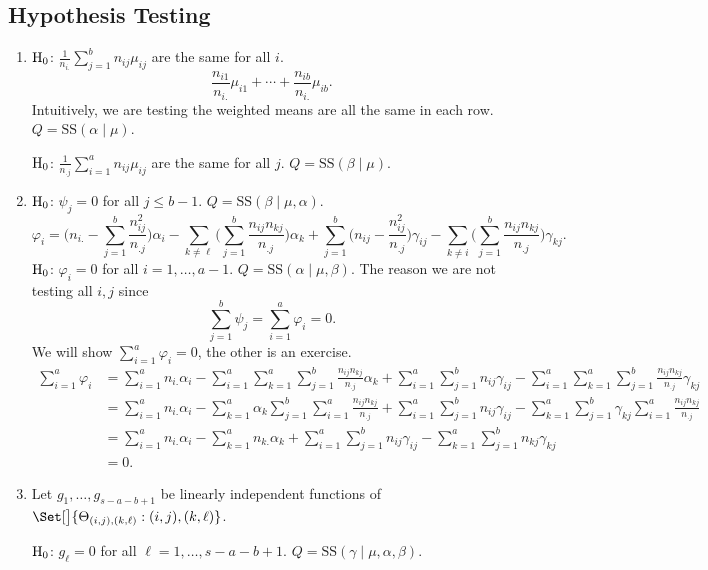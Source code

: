 \subsection*{Hypothesis Testing}
\begin{enumerate}[(1)]
    \item $ \text{H}_0 $: $ \frac{1}{n_{i.}}\sum_{j=1}^{b}n_{ij}\mu_{ij} $ are the same for all $ i $.
          \[ \frac{n_{i1}}{n_{i.}}\mu_{i1}+\cdots+\frac{n_{ib}}{n_{i.}}\mu_{ib}. \]
          Intuitively, we are testing the weighted means are all the same in each row.
          $ Q=\text{SS}(\alpha\mid \mu) $.

          $ \text{H}_0 $: $ \frac{1}{n_{.j}}\sum_{i=1}^{a}n_{ij}\mu_{ij} $ are the same for all $ j $.
          $ Q=\text{SS}(\beta\mid \mu) $.
    \item $ \text{H}_0 $: $ \psi_j=0 $ for all $ j\le b-1 $. $ Q=\text{SS}(\beta\mid \mu,\alpha) $.
          \[ \varphi_i=\biggl(n_{i.}-\sum_{j=1}^{b}\frac{n_{ij}^2}{n_{.j}}\biggr)\alpha_i
              -\sum_{k\ne \ell}\biggl(\sum_{j=1}^{b}\frac{n_{ij}n_{kj}}{n_{.j}}\biggr)\alpha_k
              +\sum_{j=1}^{b}\biggl(n_{ij}-\frac{n_{ij}^2}{n_{.j}}\biggr)\gamma_{ij}-\sum_{k\ne i}
              \biggl(\sum_{j=1}^{b}\frac{n_{ij}n_{kj}}{n_{.j}}\biggr)\gamma_{kj}. \]
          $ \text{H}_0 $: $ \varphi_i=0 $ for all $ i=1,\ldots,a-1 $. $ Q=\text{SS}(\alpha\mid \mu,\beta) $.
          The reason we are not testing all $ i,j $ since
          \[ \sum_{j=1}^{b}\psi_j=\sum_{i=1}^{a}\varphi_i=0. \]
          We will show $ \sum_{i=1}^{a}\varphi_i=0 $, the other is an exercise.
          \begin{align*}
              \sum_{i=1}^{a}\varphi_i
               & =\sum_{i=1}^{a}n_{i.}\alpha_i-\sum_{i=1}^{a}\sum_{k=1}^{a}\sum_{j=1}^{b}\frac{n_{ij}n_{kj}}{n_{.j}}\alpha_k
              +\sum_{i=1}^{a}\sum_{j=1}^{b}n_{ij}\gamma_{ij}-\sum_{i=1}^{a}\sum_{k=1}^{a}\sum_{j=1}^{b}\frac{n_{ij}n_{kj}}{n_{.j}}\gamma_{kj} \\
               & =\sum_{i=1}^{a}n_{i.}\alpha_i
              -\sum_{k=1}^{a}\alpha_k\sum_{j=1}^{b}\sum_{i=1}^{a}\frac{n_{ij}n_{kj}}{n_{.j}}
              +\sum_{i=1}^{a}\sum_{j=1}^{b}n_{ij}\gamma_{ij}
              -\sum_{k=1}^{a}\sum_{j=1}^{b}\gamma_{kj}\sum_{i=1}^{a}\frac{n_{ij}n_{kj}}{n_{.j}}                                               \\
               & =\sum_{i=1}^{a}n_{i.}\alpha_i-\sum_{k=1}^{a}n_{k.}\alpha_k
              +\sum_{i=1}^{a}\sum_{j=1}^{b}n_{ij}\gamma_{ij}-\sum_{k=1}^{a}\sum_{j=1}^{b}n_{kj}\gamma_{kj}                                    \\
               & =0.
          \end{align*}
    \item Let $ g_1,\ldots,g_{s-a-b+1} $ be linearly independent functions of
          $ \Set[\big]{\Theta_{(i,j),(k,\ell)}:(i,j),(k,\ell)} $.

          $ \text{H}_0 $: $ g_\ell=0 $ for all $ \ell=1,\ldots,s-a-b+1 $.
          $ Q=\text{SS}(\gamma\mid \mu,\alpha,\beta) $.
\end{enumerate}